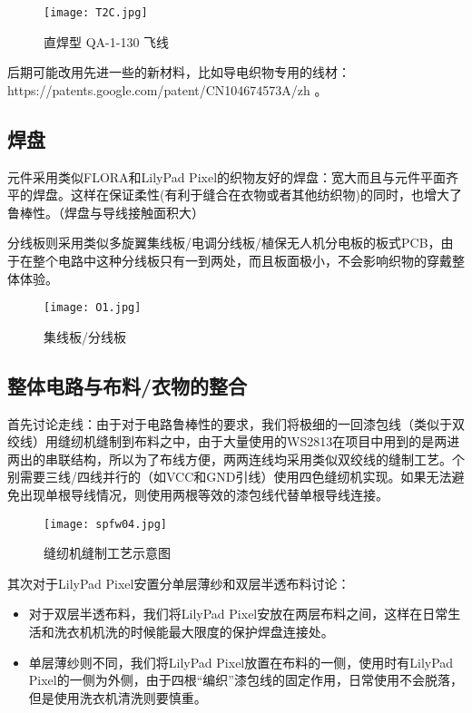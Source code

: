 \begin{figure}[htbp]
\centering
\texttt{[image: T2C.jpg]}
\caption{直焊型 QA-1-130 飞线} 
\label{r}
\end{figure}

后期可能改用先进一些的新材料，比如导电织物专用的线材：https://patents.google.com/patent/CN104674573A/zh 。


\subsection{焊盘}

元件采用类似FLORA和LilyPad Pixel的织物友好的焊盘：宽大而且与元件平面齐平的焊盘。这样在保证柔性(有利于缝合在衣物或者其他纺织物)的同时，也增大了鲁棒性。（焊盘与导线接触面积大）

分线板则采用类似多旋翼集线板/电调分线板/植保无人机分电板的板式PCB，由于在整个电路中这种分线板只有一到两处，而且板面极小，不会影响织物的穿戴整体体验。

\begin{figure}[htbp]
\centering
\texttt{[image: O1.jpg]}
\caption{集线板/分线板} 
\label{r1}
\end{figure}

\subsection{整体电路与布料/衣物的整合}

首先讨论走线：由于对于电路鲁棒性的要求，我们将极细的一回漆包线（类似于双绞线）用缝纫机缝制到布料之中，由于大量使用的WS2813在项目中用到的是两进两出的串联结构，所以为了布线方便，两两连线均采用类似双绞线的缝制工艺。个别需要三线/四线并行的（如VCC和GND引线）使用四色缝纫机实现。如果无法避免出现单根导线情况，则使用两根等效的漆包线代替单根导线连接。

\begin{figure}[htbp]
\centering
\texttt{[image: spfw04.jpg]}
\caption{缝纫机缝制工艺示意图} 
\label{f1}
\end{figure}


其次对于LilyPad Pixel安置分单层薄纱和双层半透布料讨论：

\begin{itemize}
\item 对于双层半透布料，我们将LilyPad Pixel安放在两层布料之间，这样在日常生活和洗衣机机洗的时候能最大限度的保护焊盘连接处。
\item 单层薄纱则不同，我们将LilyPad Pixel放置在布料的一侧，使用时有LilyPad Pixel的一侧为外侧，由于四根“编织”漆包线的固定作用，日常使用不会脱落，但是使用洗衣机清洗则要慎重。
\end{itemize}

